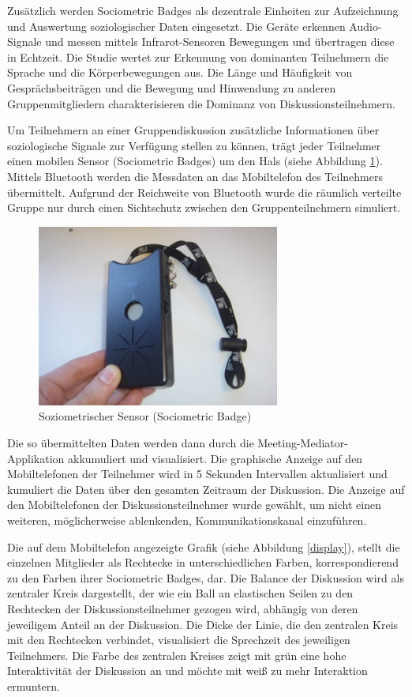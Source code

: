 Zu\-sätz\-lich werden Sociometric Badges \cite{MITbadge} als dezentrale
Einheiten zur Aufzeichnung und Auswertung soziologischer Daten eingesetzt.
Die Geräte erkennen Audio-Signale und messen mittels Infrarot-Sen\-so\-ren
Bewegungen und ü\-ber\-tra\-gen diese in Echtzeit.
Die Studie \cite{KimChaHolPent2008} wertet zur Erkennung von dominanten
Teilnehmern die Sprache und die Kör\-per\-be\-we\-gun\-gen aus. Die Län\-ge und Häu\-fig\-keit von
Ge\-sprächs\-bei\-trä\-gen und die Bewegung und Hinwendung zu anderen
Gruppenmitgliedern charakterisieren die Dominanz von Diskussionsteilnehmern.
 
Um Teilnehmern an einer Gruppendiskussion zusätzliche Informationen über
soziologische Signale zur Verfügung stellen zu können, trägt jeder Teilnehmer
einen mobilen Sensor (Sociometric Badges) um den Hals (siehe Abbildung
\ref{badge}).
 Mittels Bluetooth werden die Messdaten an das Mobiltelefon des
Teilnehmers übermittelt. Aufgrund der Reichweite von Bluetooth wurde die
räumlich verteilte Gruppe nur durch einen Sichtschutz zwischen den
Gruppenteilnehmern simuliert.

\begin{figure}[htp]
\centering
\includegraphics[width=8cm]{sociometricbadge.jpg}
\caption{Soziometrischer Sensor (Sociometric Badge) \protect\cite{MITbadge}}
\label{badge}
\end{figure}

Die so übermittelten Daten werden dann durch die Meeting-Mediator-Applikation
akkumuliert und visualisiert.
Die graphische Anzeige auf den Mobiltelefonen der Teilnehmer wird in 5 Sekunden
Intervallen aktualisiert und kumuliert die Daten über den gesamten Zeitraum der
Diskussion.
Die Anzeige auf den Mobiltelefonen der Diskussionsteilnehmer wurde gewählt, um
nicht einen weiteren, mög\-li\-cher\-wei\-se ablenkenden, Kommunikationskanal
ein\-zu\-füh\-ren.

Die auf dem Mobiltelefon angezeigte Grafik (siehe Abbildung \ref{display}),
stellt die einzelnen Mitglieder als Rechtecke in unterschiedlichen Farben,
korrespondierend zu den Farben ihrer Sociometric Badges, dar. Die Balance der
Diskussion wird als zentraler Kreis dargestellt, der wie ein Ball an elastischen
Seilen zu den Rechtecken der Diskussionsteilnehmer gezogen wird, abhängig von
deren jeweiligem Anteil an der Diskussion. Die Dicke der Linie, die den
zentralen Kreis mit den Rechtecken verbindet, visualisiert die Sprechzeit des
jeweiligen Teilnehmers. Die Farbe des zentralen Kreises zeigt mit grün eine hohe
Interaktivität der Diskussion an und möchte mit weiß zu mehr Interaktion
ermuntern.

